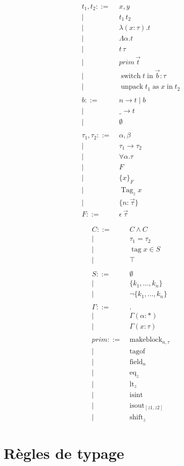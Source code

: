 \documentclass[12pt]{report}
\newcommand\term{t}
\newcommand\ty{\tau}
\newcommand\tyenv{\Gamma}
\newcommand\var{x}
\newcommand\tyvar{\alpha}
\newcommand\binding[2]{(#1 : #2)}
\newcommand\kw[1]{\operatorname{#1}}
\newcommand\syn[1]{#1 ::=& \; }
\newcommand\synor{\\ |& \; }
\begin{document}
\begin{multicols}{2}
\begin{align*}
  \syn{\term_1, \term_2} \var, y
  \synor      \term_1 \, \term_2
  \synor      \lambda \binding{\var}{\ty} . \term
  \synor      \Lambda \tyvar . \term
  \synor      \term \, \ty
  \synor      prim \, \vec{\term}
  \synor      \kw{switch} \term \kw{in} \vec{b} : \ty
  \synor      \kw{unpack} \term_1 \kw{as} \var \kw{in} \term_2
%
  \\ \\
%
  \syn{b} n \rightarrow \term \; | \; b
  \synor  \_ \rightarrow \term
  \synor  \emptyset
%
  \\ \\
%
  \syn{\ty_1, \ty_2} \tyvar, \beta
  \synor  \ty_1 \rightarrow \ty_2
  \synor  \forall \tyvar. \ty
  \synor  F
  \synor  \{ \var \}_F
  \synor  \kw{Tag}_z \var
  \synor  \{ n: \vec{\ty} \}
  \\
  \syn{F} \epsilon \, \vec{\ty}
\end{align*}
   
\begin{align*}
  \syn{C} C \wedge C
  \synor  \ty_1 = \ty_2
  \synor  \kw{tag} \var \in S
  \synor  \top
%
  \\ \\
%
  \syn{S} \emptyset
  \synor  \{ k_1, \ldots, k_n \}
  \synor  \lnot \{ k_1, \ldots, k_n \}
%
  \\ \\
%
  \syn{\tyenv} .
  \synor \tyenv \binding{\alpha}{*}
  \synor \tyenv \binding{\var}{\ty}
%
  \\ \\
%
  \syn{prim} \kw{makeblock}_{n,\ty}
  \synor \kw{tagof}
  \synor \kw{field}_{n}
  \synor \kw{eq}_{z}
  \synor \kw{lt}_{z}
  \synor \kw{isint}
  \synor \kw{isout}_{[z1,z2]}
  \synor \kw{shift}_{z}
\end{align*}
\end{multicols}

\section{Règles de typage}
\end{document}
